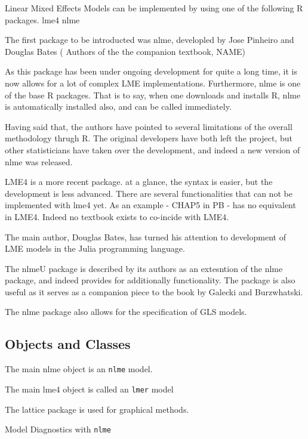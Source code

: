 \documentclass[]{article}
\begin{document}
Linear Mixed Effects Models can be implemented by using one of the following R packages.
lme4
nlme

The first package to be introducted was nlme, developled by Jose Pinheiro and Douglas Bates ( Authors of the the companion textbook, NAME)

As this package has been under ongoing development for quite a long time, it is now allows for a lot of complex LME implementations. 
Furthermore, nlme is one of the base R packages.  That is to say, when one downloads and installs R, nlme is automatically installed also, and can be called immediately.

Having said that, the authors have pointed to several limitations of the overall methodology thrugh R.
The original developers have both left the project, but other statisticians have taken over the development, and indeed a new version of nlme was released.

LME4 is a more recent package. at a glance, the syntax is easier, but the development is less advanced. There are several functionalities that can not be implemented with lme4 yet. 
As an example - CHAP5 in PB - has no equivalent in LME4. Indeed no textbook exists to co-incide with LME4.

The main author, Douglas Bates, has turned his attention to development of LME models in the Julia programming language.

The nlmeU package is described by its authors as an extesntion of the nlme package, and indeed provides for additionally functionality. The package is also useful as it serves as a companion piece to the 
book by Galecki and Burzwhatski.

The nlme package also allows for the specification of GLS models.

\subsection*{Objects and Classes}

The main nlme object is an \texttt{nlme} model.

The main lme4 object is called an \texttt{lmer} model

The lattice package is used for graphical methods.


Model Diagnostics with \texttt{nlme}
\end{document}
